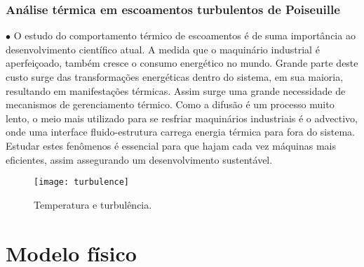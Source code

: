 \documentclass[xcolor=dvipsnames,10pt,aspectratio=169]{beamer}
\begin{document}
	
		\begin{frame}
		\frametitle{Análise térmica em escoamentos turbulentos de Poiseuille}
			\begin{minipage}[h!]{0.49\textwidth}
			$\bullet$ O estudo do comportamento térmico de escoamentos é de suma importância ao desenvolvimento científico atual. A medida que o maquinário industrial é aperfeiçoado, também cresce o consumo energético no mundo. Grande parte deste custo surge das transformações energéticas dentro do sistema, em sua maioria, resultando em manifestações térmicas. Assim surge uma grande necessidade de mecanismos de gerenciamento térmico. Como a difusão é um processo muito lento, o meio mais utilizado para se resfriar maquinários industriais é o advectivo, onde uma interface fluido-estrutura carrega energia térmica para fora do sistema. Estudar estes fenômenos é essencial para que hajam cada vez máquinas mais eficientes, assim assegurando um desenvolvimento sustentável. 
		\end{minipage}
		\begin{minipage}[h!]{0.49\textwidth}
			\begin{figure}[h!]
				\centering
				\texttt{[image: turbulence]}
				\caption{Temperatura e turbulência.}
			\end{figure}
		\end{minipage}
		\end{frame}





	\section{Modelo físico}
	
	
	
	
	
\end{document}
